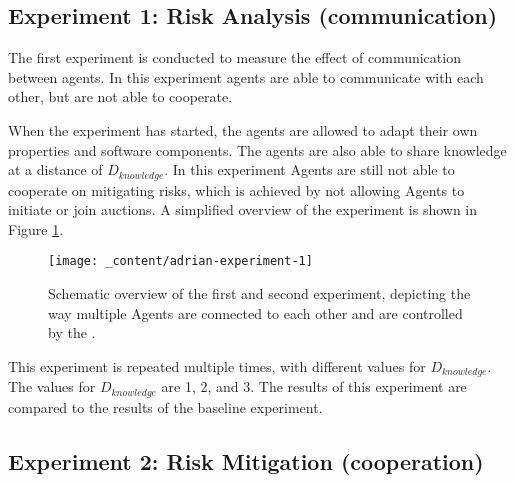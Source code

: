 \subsection{Experiment 1: Risk Analysis (communication)}

The first experiment is conducted to measure the effect of communication between agents. In this experiment agents are able to communicate with each other,  but are not able to cooperate. 

When the experiment has started, the agents are allowed to adapt their own properties and software components. The agents are also able to share knowledge at a distance of \( D_{knowledge} \). In this experiment Agents are still not able to cooperate on mitigating risks, which is achieved by not allowing Agents to initiate or join auctions. A simplified overview of the experiment is shown in Figure \ref{fig:experiment-1}.

\begin{figure}[H]
    \centering
    \texttt{[image: \_content/adrian-experiment-1]}
    \caption{Schematic overview of the first and second experiment, depicting the way multiple Agents are connected to each other and are controlled by the .}
    \label{fig:experiment-1}
\end{figure}

This experiment is repeated multiple times, with different values for \( D_{knowledge} \). The values for \( D_{knowledge} \) are 1, 2, and 3. The results of this experiment are compared to the results of the baseline experiment.

\subsection{Experiment 2: Risk Mitigation (cooperation)}

